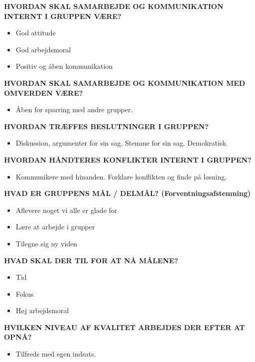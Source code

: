 \textbf{HVORDAN SKAL SAMARBEJDE OG KOMMUNIKATION INTERNT I GRUPPEN VÆRE? }
\begin{itemize}
\item God attitude 

\item God arbejdsmoral 

\item Positiv og åben kommunikation 
\end{itemize}

\textbf{HVORDAN SKAL SAMARBEJDE OG KOMMUNIKATION MED OMVERDEN VÆRE? }
\begin{itemize}
\item Åben for sparring med andre grupper. 
\end{itemize}
 

\textbf{HVORDAN TRÆFFES BESLUTNINGER I GRUPPEN? } 
\begin{itemize}
\item Diskussion, argumenter for sin sag. Stemme for sin sag. Demokratisk. 
\end{itemize}
 

\textbf{HVORDAN HÅNDTERES KONFLIKTER INTERNT I GRUPPEN? }
\begin{itemize}
\item Kommunikere med hinanden. Forklare konflikten og finde på løsning. 
\end{itemize}

\textbf{HVAD ER GRUPPENS MÅL / DELMÅL? (Forventningsafstemning) 
}
\begin{itemize}
\item Aflevere noget vi alle er glade for 

\item Lære at arbejde i grupper 

\item Tilegne sig ny viden
\end{itemize}

\textbf{HVAD SKAL DER TIL FOR AT NÅ MÅLENE? }
\begin{itemize}
\item Tid 

\item Fokus 

\item Høj arbejdsmoral 
\end{itemize}
 

\textbf{HVILKEN NIVEAU AF KVALITET ARBEJDES DER EFTER AT OPNÅ? }
\begin{itemize}
\item Tilfreds med egen indsats.  
\end{itemize}

